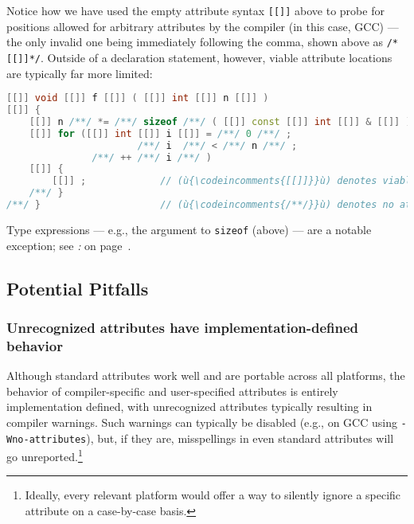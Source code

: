 \noindent Notice how we have used the empty attribute syntax \texttt{[[]]} above
to probe for positions allowed for arbitrary attributes by the compiler
(in this case, GCC) --- the only invalid one being immediately following
the comma, shown above as \texttt{/*[[]]*/}. Outside of a declaration
statement, however, viable attribute locations are typically far more
limited:

\begin{lstlisting}[language=C++,label=attribute-gcc-example]
[[]] void [[]] f [[]] ( [[]] int [[]] n [[]] )
[[]] {
    [[]] n /**/ *= /**/ sizeof /**/ ( [[]] const [[]] int [[]] & [[]] ) /**/;
    [[]] for ([[]] int [[]] i [[]] = /**/ 0 /**/ ;
                       /**/ i  /**/ < /**/ n /**/ ;
               /**/ ++ /**/ i /**/ )
    [[]] {
        [[]] ;             // (ù{\codeincomments{[[]]}}ù) denotes viable attribute location (on GCC)
    /**/ }
/**/ }                     // (ù{\codeincomments{/**/}}ù) denotes no attribute allowed (on GCC)
\end{lstlisting}
    
\noindent Type expressions --- e.g., the argument to \texttt{sizeof} (above) ---
are a notable exception; see {\it{}:} {\it{}} on page~\pageref{not-every-syntactic-location-is-viable-for-an-attribute}. 

\subsection[Potential Pitfalls]{Potential Pitfalls}\label{attribute-potential-pitfalls}

\subsubsection[Unrecognized attributes have implementation-defined behavior]{Unrecognized attributes have implementation-defined behavior}\label{unrecognized-attributes-have-implementation-defined-behavior}

Although standard attributes work well and are portable across all
platforms, the behavior of compiler-specific and user-specified
attributes is entirely implementation defined, with unrecognized
attributes typically resulting in compiler warnings. Such warnings can typically be disabled (e.g., on GCC using
\texttt{-Wno-attributes}), but, if they are, misspellings in even standard
attributes will go unreported.{\cprotect\footnote{Ideally, every relevant platform would offer a way to silently ignore a specific
  attribute on a case-by-case basis.}}

